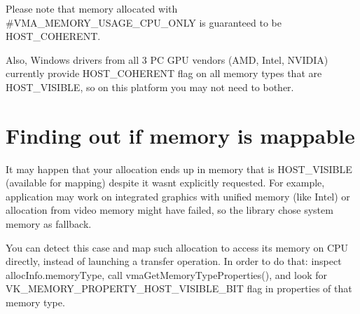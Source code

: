 Please note that memory allocated with \#\+V\+M\+A\+\_\+\+M\+E\+M\+O\+R\+Y\+\_\+\+U\+S\+A\+G\+E\+\_\+\+C\+P\+U\+\_\+\+O\+N\+LY is guaranteed to be {\ttfamily H\+O\+S\+T\+\_\+\+C\+O\+H\+E\+R\+E\+NT}.

Also, Windows drivers from all 3 PC G\+PU vendors (A\+MD, Intel, N\+V\+I\+D\+IA) currently provide {\ttfamily H\+O\+S\+T\+\_\+\+C\+O\+H\+E\+R\+E\+NT} flag on all memory types that are {\ttfamily H\+O\+S\+T\+\_\+\+V\+I\+S\+I\+B\+LE}, so on this platform you may not need to bother.\hypertarget{memory_mapping_memory_mapping_finding_if_memory_mappable}{}\section{Finding out if memory is mappable}\label{memory_mapping_memory_mapping_finding_if_memory_mappable}
It may happen that your allocation ends up in memory that is {\ttfamily H\+O\+S\+T\+\_\+\+V\+I\+S\+I\+B\+LE} (available for mapping) despite it wasn\textquotesingle{}t explicitly requested. For example, application may work on integrated graphics with unified memory (like Intel) or allocation from video memory might have failed, so the library chose system memory as fallback.

You can detect this case and map such allocation to access its memory on C\+PU directly, instead of launching a transfer operation. In order to do that\+: inspect {\ttfamily alloc\+Info.\+memory\+Type}, call vma\+Get\+Memory\+Type\+Properties(), and look for {\ttfamily V\+K\+\_\+\+M\+E\+M\+O\+R\+Y\+\_\+\+P\+R\+O\+P\+E\+R\+T\+Y\+\_\+\+H\+O\+S\+T\+\_\+\+V\+I\+S\+I\+B\+L\+E\+\_\+\+B\+IT} flag in properties of that memory type.



